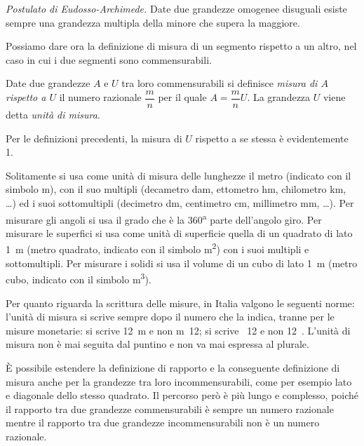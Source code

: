 \noindent \emph{Postulato di Eudosso-Archimede.} Date due grandezze 
omogenee disuguali esiste sempre una grandezza multipla della minore 
che supera la maggiore.\vspace{8pt}

Possiamo dare ora la definizione di misura di un segmento rispetto a 
un altro, nel caso in cui i due segmenti sono commensurabili.
\begin{definizione}
Date due grandezze \(A\) e \(U\) tra loro commensurabili si definisce 
\emph{misura di \(A\) rispetto a \(U\)} il numero razionale 
\(\dfrac{m}{n}\) per il quale \(A=\dfrac{m}{n}U\). La grandezza \(U\) viene 
detta \emph{unità di misura}.
\end{definizione}

Per le definizioni precedenti, la misura di \(U\) rispetto a se stessa 
è evidentemente 1.

Solitamente si usa come unità di misura delle lunghezze il metro 
(indicato con il simbolo m), con il suo multipli (decametro dam, 
ettometro hm, chilometro km, \ldots{}) ed i suoi sottomultipli 
(decimetro dm, centimetro cm, millimetro mm, \ldots{}). Per misurare 
gli angoli si usa il grado che è la 360\textsuperscript{a} parte 
dell'angolo giro. Per misurare le superfici si usa come unità di 
superficie quella di un quadrato di lato 1~m (metro quadrato, 
indicato con il simbolo m\textsuperscript{2}) con i suoi multipli e 
sottomultipli. Per misurare i solidi si usa il volume di un cubo di 
lato 1~m (metro cubo, indicato con il simbolo m\textsuperscript{3}).

Per quanto riguarda la scrittura delle misure, in Italia valgono le 
seguenti norme: l'unità di misura si scrive sempre dopo il numero che 
la indica, tranne per le misure monetarie: si scrive 12~m e non m~12; 
si scrive \officialeuro~12 e non 12~\officialeuro. L'unità di misura 
non è mai seguita dal puntino e non va mai espressa al plurale.

\`E possibile estendere la definizione di rapporto e la conseguente 
definizione di misura anche per la grandezze tra loro 
incommensurabili, come per esempio lato e diagonale dello stesso 
quadrato. Il percorso però è più lungo e complesso, poiché il 
rapporto tra due grandezze commensurabili è sempre un numero razionale 
mentre il rapporto tra due grandezze incommensurabili non è un numero 
razionale.

